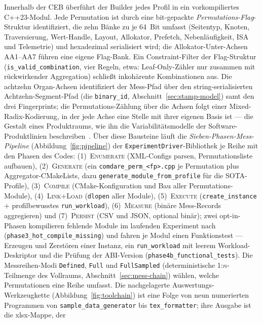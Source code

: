 \begin{nurlang}
Innerhalb der CEB überführt der Builder jedes Profil in ein vorkompiliertes C++23-Modul. Jede Permutation
ist durch eine bit-gepackte \emph{Permutations-Flag}-Struktur identifiziert, die zehn Bänke zu je 64~Bit
umfasst (Seitentyp, Knoten, Traversierung, Wert-Handle, Layout, Allokator, Prefetch, Nebenläufigkeit, ISA
und Telemetrie) und hexadezimal serialisiert wird; die Allokator-Unter-Achsen AA1--AA7 führen eine eigene
Flag-Bank. Ein Constraint-Filter der Flag-Struktur (\texttt{is\_valid\_combination}, vier Regeln, etwa:
Leaf-Only-Zähler nur zusammen mit rückwirkender Aggregation) schließt inkohärente Kombinationen aus. Die
achtzehn Organ-Achsen identifiziert der Mess-Pfad über den string-serialisierten Achtzehn-Segment-Pfad
(die \texttt{binary\_id}, Abschnitt~\ref{sec:stamp-model}) samt den drei Fingerprints; die
Permutations-Zählung über die Achsen folgt einer Mixed-Radix-Kodierung, in der jede Achse eine Stelle mit
ihrer eigenen Basis ist --- die Gestalt eines Produktraums, wie ihn die Variabilitätsmodelle der
Software-Produktlinien beschreiben~\cite{pohl2005spl}. Über diese Bausteine läuft die
\emph{Sieben-Phasen-Mess-Pipeline} (Abbildung~\ref{fig:pipeline}) der \texttt{ExperimentDriver}-Bibliothek
je Reihe mit den Phasen des Codes: (1)~\textsc{Enumerate} (XML-Configs parsen, Permutationsliste
aufbauen), (2)~\textsc{Generate} (ein \texttt{comdare\_perm\_<fp>.cpp} je Permutation plus
Aggregator-CMakeLists, dazu \texttt{generate\_\allowbreak{}module\_\allowbreak{}from\_\allowbreak{}profile}
für die SOTA-Profile), (3)~\textsc{Compile} (CMake-Konfiguration und Bau aller Permutations-Module),
(4)~\textsc{Link+Load} (\texttt{dlopen} aller Module), (5)~\textsc{Execute} (\texttt{create\_instance} +
profilbewusstes \texttt{run\_workload}), (6)~\textsc{Measure} (binäre Mess-Records aggregieren) und
(7)~\textsc{Persist} (CSV und JSON, optional binär); zwei opt-in-Phasen kompilieren fehlende Module im laufenden Experiment nach
(\texttt{phase3\_hot\_compile\_missing}) und fahren je Modul einen Funktionstest --- Erzeugen und
Zerstören einer Instanz, ein \texttt{run\_workload} mit leerem Workload-Deskriptor und die Prüfung der
ABI-Version (\texttt{phase4b\_functional\_tests}). Die Messreihen-Modi \texttt{Defined}, \texttt{Full} und
\texttt{FullSampled} (deterministische 1:$n$-Teilmenge des Vollraums, Abschnitt~\ref{sec:mess-chain})
wählen, welche Permutationen eine Reihe umfasst. Die nachgelagerte Auswertungs-Werkzeugkette
(Abbildung~\ref{fig:toolchain}) ist eine Folge von neun numerierten Programmen von
\texttt{sample\_data\_generator} bis \texttt{tex\_formatter}; ihre Ausgabe ist die xlsx-Mappe, der

\end{nurlang}
